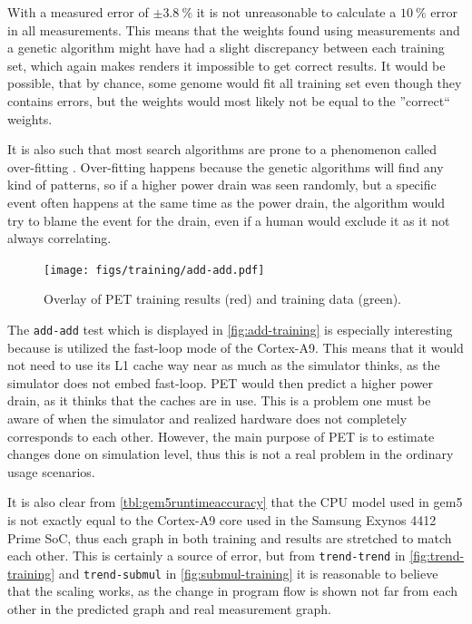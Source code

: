 With a measured error of $\pm3.8~\%$ it is not unreasonable to calculate a $10~\%$ error in
all measurements. This means that the weights found using measurements and a genetic algorithm might
have had a slight discrepancy between each training set, which again makes renders it impossible to get
correct results. It would be possible, that by chance, some genome would fit all training set even though
they contains errors, but the weights would most likely not be equal to the ''correct`` weights.

It is also such that most search algorithms are prone to a phenomenon called
over-fitting \cite{russellnorvig}.  Over-fitting happens because the genetic
algorithms will find any kind of patterns, so if a higher power drain was seen
randomly, but a specific event often happens at the same time as the power
drain, the algorithm would try to blame the event for the drain, even if a human
would exclude it as it not always correlating.

\begin{figure}[ht]
\centering
\texttt{[image: figs/training/add-add.pdf]}
\caption{Overlay of PET training results (red) and training data (green).}
\label{fig:add-training}
\end{figure}

The \texttt{add-add} test which is displayed in \autoref{fig:add-training} is
especially interesting because is utilized the fast-loop mode of the Cortex-A9.
This means that it would not need to use its L1 cache way near as much as the
simulator thinks, as the simulator does not embed fast-loop. PET would then
predict a higher power drain, as it thinks that the caches are in use. This is
a problem one must be aware of when the simulator and realized hardware does not
completely corresponds to each other. However, the main purpose of PET is to
estimate changes done on simulation level, thus this is not a real problem in the
ordinary usage scenarios.

It is also clear from \autoref{tbl:gem5runtimeaccuracy} that the CPU model used
in gem5 is not exactly equal to the Cortex-A9 core used in the Samsung Exynos
4412 Prime SoC, thus each graph in both training and results are stretched to
match each other. This is certainly a source of error, but from
\texttt{trend-trend} in \autoref{fig:trend-training} and \texttt{trend-submul}
in \autoref{fig:submul-training} it is reasonable to believe that the scaling
works, as the change in program flow is shown not far from each other in the
predicted graph and real measurement graph.
